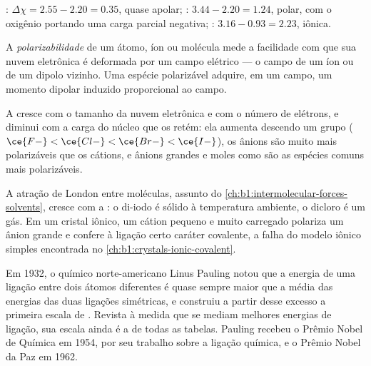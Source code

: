 \begin{example}\label{ex:b1:periodicity:bonds}
: $\Delta\chi = 2.55 - 2.20 = 0.35$, quase apolar;
: $3.44 - 2.20 = 1.24$, polar, com o oxigênio portando uma carga
parcial negativa; : $3.16 - 0.93 = 2.23$, iônica.
\end{example}

\begin{definition}[Polarizabilidade]\label{def:b1:periodicity:polarisability}
A \emph{polarizabilidade} de um átomo, íon ou
molécula mede a facilidade com que sua nuvem eletrônica é deformada por
um campo elétrico --- o campo de um íon ou de um dipolo vizinho. Uma
espécie polarizável adquire, em um campo, um momento dipolar induzido
proporcional ao campo.
\end{definition}

\begin{proposition}\label{prop:b1:periodicity:polarisability-trend}
A  cresce com o tamanho da nuvem eletrônica e com o
número de elétrons, e diminui com a carga do núcleo que os retém: ela
aumenta descendo um grupo ($\ce{F-} < \ce{Cl-} < \ce{Br-} <
\ce{I-}$), os ânions são muito mais polarizáveis que os cátions, e
ânions grandes e moles como  são as espécies comuns mais
polarizáveis.
\end{proposition}

\begin{example}\label{ex:b1:periodicity:pol}
A atração de London entre moléculas, assunto do
\cref{ch:b1:intermolecular-forces-solvents}, cresce com a :
o di-iodo é sólido à temperatura ambiente, o dicloro é um gás. Em um
cristal iônico, um cátion pequeno e muito carregado polariza um ânion
grande e confere à ligação certo caráter covalente, a falha do modelo
iônico simples encontrada no \cref{ch:b1:crystals-ionic-covalent}.
\end{example}

\begin{history}
Em 1932, o químico norte-americano Linus Pauling notou que a energia de
uma ligação entre dois átomos diferentes é quase sempre maior que a
média das energias das duas ligações simétricas, e construiu a partir
desse excesso a primeira escala de . Revista à medida
que se mediam melhores energias de ligação, sua escala ainda é a de todas
as tabelas. Pauling recebeu o Prêmio Nobel de Química em 1954, por seu
trabalho sobre a ligação química, e o Prêmio Nobel da Paz em 1962.
\end{history}


